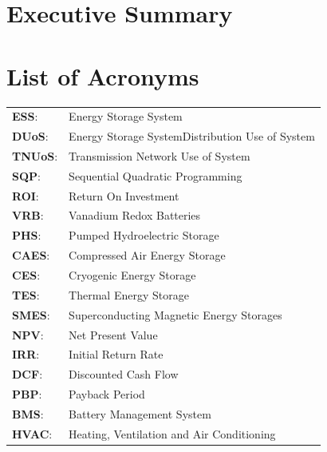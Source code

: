 \documentclass[fontsize=9.5pt]{extarticle}
\numberwithin{figure}{section} %
\begin{document}
\newpage


\section*{Executive Summary}\label{ExecSummary}

\newpage

\tableofcontents


\newpage
{}
\listoffigures
{}
\listoftables
{}
\section*{List of Acronyms}\label{acronyms}
\begin{tabular}{p{1cm}p{12cm}}
\textbf{ESS}:& Energy Storage System \\
\textbf{DUoS}:& Energy Storage SystemDistribution Use of System\\
\textbf{TNUoS}:& Transmission Network Use of System\\
\textbf{SQP}:& Sequential Quadratic Programming\\
\textbf{ROI}:& Return On Investment\\
\textbf{VRB}:& Vanadium Redox Batteries\\
\textbf{PHS}:& Pumped Hydroelectric Storage\\
\textbf{CAES}:& Compressed Air Energy Storage\\
\textbf{CES}:& Cryogenic Energy Storage\\
\textbf{TES}:& Thermal Energy Storage\\
\textbf{SMES}:& Superconducting Magnetic Energy Storages\\
\textbf{NPV}:& Net Present Value\\
\textbf{IRR}:& Initial Return Rate\\
\textbf{DCF}:& Discounted Cash Flow\\
\textbf{PBP}:& Payback Period\\
\textbf{BMS}:& Battery Management System\\
\textbf{HVAC}:& Heating, Ventilation and Air Conditioning\\
\end{tabular}
\end{document}
